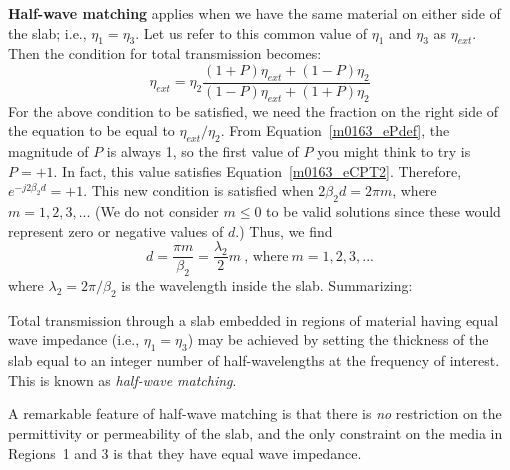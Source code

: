 {\bf Half-wave matching} applies when we have the same material on either side of the slab; i.e., $\eta_1=\eta_3$.  
Let us refer to this common value of $\eta_1$ and $\eta_3$ as $\eta_{ext}$.  Then the condition for total transmission becomes:
%
\begin{equation}
\eta_{ext}  
= \eta_2 \frac{ (1+P)\eta_{ext} + (1-P)\eta_2 }{ (1-P)\eta_{ext} + (1+P)\eta_2  }
\label{m0163_eCPT2}
\end{equation}
%
For the above condition to be satisfied, we need the fraction on the right side of the equation to be equal to $\eta_{ext}/\eta_{2}$.  
From Equation~\ref{m0163_ePdef}, the magnitude of $P$ is always 1, so the first value of $P$ you might think to try is $P=+1$. 
In fact, this value satisfies Equation~\ref{m0163_eCPT2}. 
Therefore, $e^{-j2\beta_2 d} = +1$.  
This new condition is satisfied when $2\beta_2 d = 2\pi m$, where $m=1, 2, 3,... $ 
(We do not consider $m\le0$ to be valid solutions since these would represent zero or negative values of $d$.)   
Thus, we find 
%
\begin{equation}
d = \frac{\pi m}{\beta_2} = \frac{\lambda_2}{2}m ~\mbox{, where} ~ m=1, 2, 3,... 
\end{equation}
%
where $\lambda_2 = 2\pi/\beta_2$ is the wavelength inside the slab.
Summarizing: 
%
\begin{mdframed}[backgroundcolor=yellow!20,nobreak=true] 
Total transmission through a slab embedded in regions of material having equal wave impedance (i.e., $\eta_1=\eta_3$) may be achieved by setting the thickness of the slab equal to an integer number of half-wavelengths at the frequency of interest.  This is known as \emph{half-wave matching}.
\end{mdframed}
%
A remarkable feature of half-wave matching is that there is {\it no} restriction on the permittivity or permeability of the slab, and the only constraint on the media in Regions~1 and 3 is that they have equal wave impedance. 

